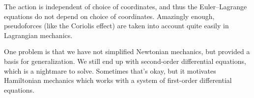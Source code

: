 The action is independent of choice of coordinates, and thus the
Euler--Lagrange equations do not depend on choice of coordinates.
Amazingly enough, pseudoforces (like the Coriolis effect) are taken into
account quite easily in Lagrangian mechanics.

One problem is that we have not simplified Newtonian mechanics, but
provided a basis for generalization. We still end up with second-order
differential equations, which is a nightmare to solve. Sometimes that's
okay, but it motivates Hamiltonian mechanics which works with a system
of first-order differential equations.